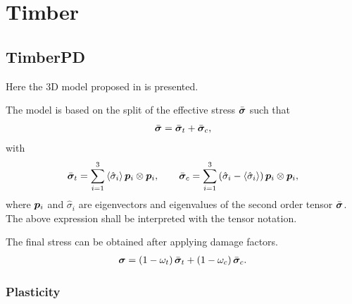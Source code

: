 \chapter{Timber}
\section{TimberPD}
Here the 3D model proposed in \cite{SirumbalZapata2018} is presented.

The model is based on the split of the effective stress $\bar{\bm{\sigma}}$ such that
\begin{gather}
\bar{\bm{\sigma}}=\bar{\bm{\sigma}}_t+\bar{\bm{\sigma}}_c,
\end{gather}
with
\begin{gather}
\bar{\bm{\sigma}}_t=\sum_{i=1}^{3}\left\langle\hat{\sigma}_i\right\rangle\bm{p}_i\otimes\bm{p}_i,\qquad
\bar{\bm{\sigma}}_c=\sum_{i=1}^{3}\left(\hat{\sigma}_i-\left\langle\hat{\sigma}_i\right\rangle\right)\bm{p}_i\otimes\bm{p}_i,
\end{gather}
where $\bm{p}_i$ and $\hat{\sigma}_i$ are eigenvectors and eigenvalues of the second order tensor $\bar{\bm{\sigma}}$. The above expression shall be interpreted with the tensor notation.

The final stress can be obtained after applying damage factors.
\begin{gather}
\bm{\sigma}=\left(1-\omega_t\right)\bar{\bm{\sigma}}_t+\left(1-\omega_c\right)\bar{\bm{\sigma}}_c.
\end{gather}
\subsection{Plasticity}
